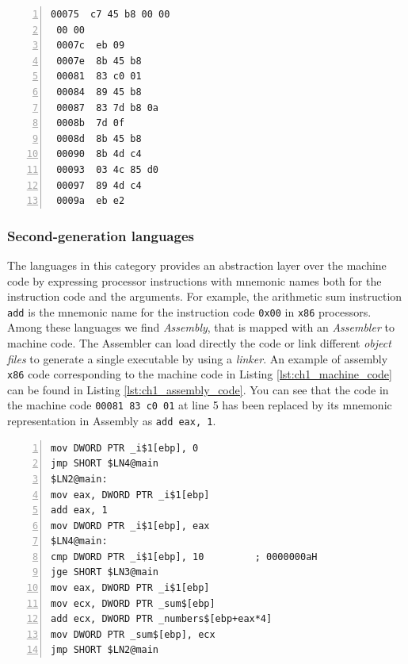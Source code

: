 \begin{minipage}{\linewidth}
\begin{lstlisting}[numbers = left, caption = x86 Machine code to compute the sum of a sequence of numbers, label = lst:ch1_machine_code]
 00075	c7 45 b8 00 00
 00 00
 0007c	eb 09	
 0007e	8b 45 b8
 00081	83 c0 01
 00084	89 45 b8
 00087	83 7d b8 0a
 0008b	7d 0f
 0008d	8b 45 b8
 00090	8b 4d c4
 00093	03 4c 85 d0
 00097	89 4d c4
 0009a	eb e2
\end{lstlisting}
\end{minipage}

\subsubsection*{Second-generation languages}
The languages in this category provides an abstraction layer over the machine code by expressing processor instructions with mnemonic names both for the instruction code and the arguments. For example, the arithmetic sum instruction \texttt{add} is the mnemonic name for the instruction code \texttt{0x00} in \texttt{x86} processors. Among these languages we find \textit{Assembly}, that is mapped with an \textit{Assembler} to machine code. The Assembler can load directly the code or link different \textit{object files} to generate a single executable by using a \textit{linker}. An example of assembly \texttt{x86} code corresponding to the machine code in Listing \ref{lst:ch1_machine_code} can be found in Listing \ref{lst:ch1_assembly_code}. You can see that the code in the machine code \texttt{00081	83 c0 01} at line 5 has been replaced by its mnemonic representation in Assembly as \texttt{add	eax, 1}.

\begin{minipage}{\linewidth}
\begin{lstlisting}[numbers = left, caption = Assembly x86 code to compute the sum of a sequence of numbers, label = lst:ch1_assembly_code]
mov	DWORD PTR _i$1[ebp], 0
jmp	SHORT $LN4@main
$LN2@main:
mov	eax, DWORD PTR _i$1[ebp]
add	eax, 1
mov	DWORD PTR _i$1[ebp], eax
$LN4@main:
cmp	DWORD PTR _i$1[ebp], 10			; 0000000aH
jge	SHORT $LN3@main
mov	eax, DWORD PTR _i$1[ebp]
mov	ecx, DWORD PTR _sum$[ebp]
add	ecx, DWORD PTR _numbers$[ebp+eax*4]
mov	DWORD PTR _sum$[ebp], ecx
jmp	SHORT $LN2@main
\end{lstlisting}
\end{minipage}

